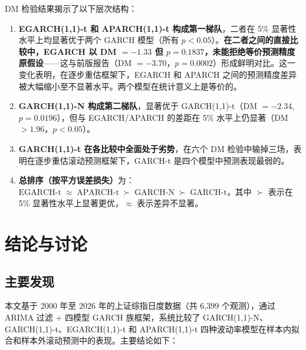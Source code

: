\documentclass[12pt,a4paper]{article}
\begin{document}
DM 检验结果揭示了以下层次结构：

\begin{enumerate}[nosep,label=(\arabic*)]
    \item \textbf{EGARCH(1,1)-t 和 APARCH(1,1)-t 构成第一梯队}，二者在 5\% 显著性水平上均显著优于两个 GARCH 模型（所有 $p < 0.05$）。\textbf{在二者之间的直接比较中，EGARCH 以 DM $=-1.33$ 但 $p = 0.1837$，未能拒绝等价预测精度原假设}——这与前版报告（DM $=-3.70$，$p=0.0002$）形成鲜明对比。这一变化表明，在逐步重估框架下，EGARCH 和 APARCH 之间的预测精度差异被大幅缩小至不显著水平。两个模型在统计意义上是等价的。

    \item \textbf{GARCH(1,1)-N 构成第二梯队}，显著优于 GARCH(1,1)-t（DM $=-2.34$, $p=0.0196$），但与 EGARCH/APARCH 的差距在 5\% 水平上仍显著（DM $> 1.96$，$p < 0.05$）。

    \item \textbf{GARCH(1,1)-t 在各比较中全面处于劣势}，在六个 DM 检验中输掉三场，表明在逐步重估滚动预测框架下，GARCH-t 是四个模型中预测表现最弱的。

    \item \textbf{总排序（按平方误差损失）}为：$\mathrm{EGARCH\text{-}t} \;\approx\; \mathrm{APARCH\text{-}t} \;\succ\; \mathrm{GARCH\text{-}N} \;\succ\; \mathrm{GARCH\text{-}t}$，其中 $\succ$ 表示在 5\% 显著性水平上显著更优，$\approx$ 表示差异不显著。
\end{enumerate}

\section{结论与讨论}\label{sec:conclusion}

\subsection{主要发现}

本文基于 2000 年至 2026 年的上证综指日度数据（共 6{,}399 个观测），通过 ARIMA 过滤 + 四模型 GARCH 族框架，系统比较了 GARCH(1,1)-N、GARCH(1,1)-t、EGARCH(1,1)-t 和 APARCH(1,1)-t 四种波动率模型在样本内拟合和样本外滚动预测中的表现。主要结论如下：
\end{document}
